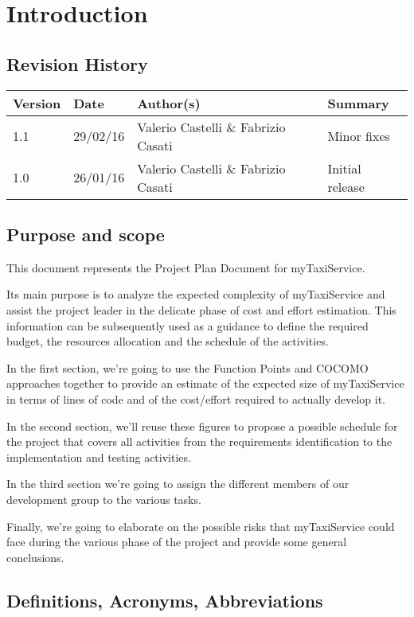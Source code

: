 \chapter{Introduction}
\section{Revision History}
\begin{center}
\begin{longtable}{|l|l|l|l|}
\hline
Version &
Date &
Author(s) &
Summary \\
\hline
1.1 &
29/02/16 &
Valerio Castelli \& Fabrizio Casati &
Minor fixes \\\hline
1.0 &
26/01/16 &
Valerio Castelli \& Fabrizio Casati &
Initial release \\
\hline
\end{longtable}
\end{center}
\section{Purpose and scope}
This document represents the Project Plan Document for myTaxiService.

Its main purpose is to analyze the expected complexity of myTaxiService and assist the project leader in the delicate phase of cost and effort estimation. This information can be subsequently used as a guidance to define the required budget, the resources allocation and the schedule of the activities. 

In the first section, we're going to use the Function Points and COCOMO approaches together to provide an estimate of the expected size of myTaxiService in terms of lines of code and of the cost/effort required to actually develop it.

In the second section, we'll reuse these figures to propose a possible schedule for the project that covers all activities from the requirements identification to the implementation and testing activities. 

In the third section we're going to assign the different members of our development group to the various tasks.

Finally, we're going to elaborate on the possible risks that myTaxiService could face during the various phase of the project and provide some general conclusions.
\section{Definitions, Acronyms, Abbreviations}
